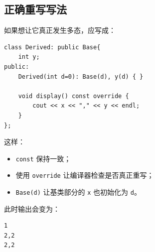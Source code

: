 \documentclass[11pt, a4paper]{article}
\begin{document}
\subsection*{正确重写写法}
如果想让它真正发生多态，应写成：
\begin{lstlisting}
class Derived: public Base{
    int y;
public:
    Derived(int d=0): Base(d), y(d) { }

    void display() const override {
        cout << x << "," << y << endl;
    }
};
\end{lstlisting}

这样：
\begin{itemize}
    \item \texttt{const} 保持一致；
    \item 使用 \texttt{override} 让编译器检查是否真正重写；
    \item \texttt{Base(d)} 让基类部分的 \texttt{x} 也初始化为 \texttt{d}。
\end{itemize}

此时输出会变为：
\begin{lstlisting}
1
2,2
2,2
\end{lstlisting}
\end{document}
